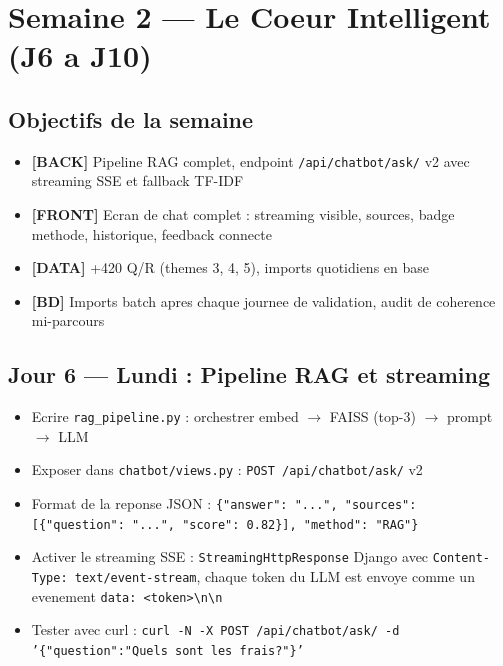 \documentclass[11pt,a4paper]{article}
\newcommand{\back}{\textcolor{ragcolor}{\textbf{[BACK]}}}
\newcommand{\front}{\textcolor{reactcolor}{\textbf{[FRONT]}}}
\newcommand{\datas}{\textcolor{datacolor}{\textbf{[DATA]}}}
\newcommand{\db}{\textcolor{dbcolor}{\textbf{[BD]}}}
\begin{document}
\clearpage

\section{Semaine 2 --- Le Coeur Intelligent (J6 a J10)}

\subsection*{Objectifs de la semaine}
\begin{itemize}
    \item \back{} Pipeline RAG complet, endpoint \texttt{/api/chatbot/ask/} v2 avec streaming SSE et fallback TF-IDF
    \item \front{} Ecran de chat complet : streaming visible, sources, badge methode, historique, feedback connecte
    \item \datas{} +420 Q/R (themes 3, 4, 5), imports quotidiens en base
    \item \db{} Imports batch apres chaque journee de validation, audit de coherence mi-parcours
\end{itemize}

\subsection{Jour 6 --- Lundi : Pipeline RAG et streaming}

\begin{ragbox}[Backend --- J6]
\begin{itemize}
    \item[$\square$] Ecrire \texttt{rag\_pipeline.py} : orchestrer embed $\rightarrow$ FAISS (top-3) $\rightarrow$ prompt $\rightarrow$ LLM
    \item[$\square$] Exposer dans \texttt{chatbot/views.py} : \texttt{POST /api/chatbot/ask/} v2
    \item[$\square$] Format de la reponse JSON : \texttt{\{"answer": "...", "sources": [\{"question": "...", "score": 0.82\}], "method": "RAG"\}}
    \item[$\square$] Activer le streaming SSE : \texttt{StreamingHttpResponse} Django avec \texttt{Content-Type: text/event-stream}, chaque token du LLM est envoye comme un evenement \texttt{data: <token>\textbackslash n\textbackslash n}
    \item[$\square$] Tester avec curl : \texttt{curl -N -X POST /api/chatbot/ask/ -d '\{"question":"Quels sont les frais?"\}'}
\end{itemize}
\end{ragbox}
\end{document}
